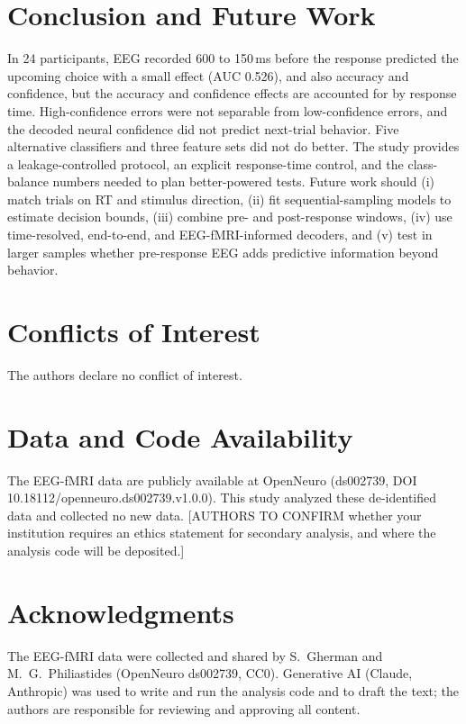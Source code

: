 \documentclass[11pt,a4paper]{article}
\begin{document}
\section{Conclusion and Future Work}

In 24 participants, EEG recorded 600 to 150\,ms before the response predicted the upcoming choice with a small effect (AUC 0.526), and also accuracy and confidence, but the accuracy and confidence effects are accounted for by response time. High-confidence errors were not separable from low-confidence errors, and the decoded neural confidence did not predict next-trial behavior. Five alternative classifiers and three feature sets did not do better. The study provides a leakage-controlled protocol, an explicit response-time control, and the class-balance numbers needed to plan better-powered tests. Future work should (i) match trials on RT and stimulus direction, (ii) fit sequential-sampling models to estimate decision bounds, (iii) combine pre- and post-response windows, (iv) use time-resolved, end-to-end, and EEG-fMRI-informed decoders, and (v) test in larger samples whether pre-response EEG adds predictive information beyond behavior.

\section*{Conflicts of Interest}
The authors declare no conflict of interest.

\section*{Data and Code Availability}
The EEG-fMRI data are publicly available at OpenNeuro (ds002739, DOI 10.18112/openneuro.\allowbreak ds002739.v1.0.0). This study analyzed these de-identified data and collected no new data. [AUTHORS TO CONFIRM whether your institution requires an ethics statement for secondary analysis, and where the analysis code will be deposited.]

\section*{Acknowledgments}
The EEG-fMRI data were collected and shared by S.\ Gherman and M.\ G.\ Philiastides (OpenNeuro ds002739, CC0). Generative AI (Claude, Anthropic) was used to write and run the analysis code and to draft the text; the authors are responsible for reviewing and approving all content.
\end{document}
